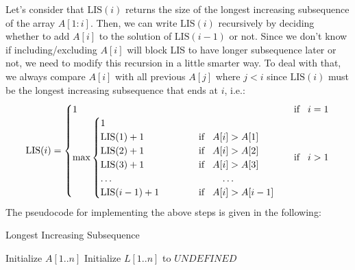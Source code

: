 \documentclass[11pt]{article}
\theoremstyle{definition}
\begin{document}
Let's consider that $\text{LIS}(i)$ returns the size of the longest increasing subsequence of the array $A[1:i]$. Then, we can write $\text{LIS}(i)$ recursively by deciding whether to add $A[i]$ to the solution of $\text{LIS}(i-1)$ or not. Since we don't know if including/excluding $A[i]$ will block LIS to have longer subsequence later or not, we need to modify this recursion in a little smarter way. To deal with that, we always compare $A[i]$ with all previous $A[j]$ where $j<i$ since $\text{LIS}(i)$ must be the longest increasing subsequence that ends at $i$, i.e.:
\begin{equation*}
\text{LIS}(i)=
\begin{cases}
1 \hspace{5cm} &\text{if} \hspace{0.3cm} i=1 \\
\text{max}
    \begin{cases}
    1 \hspace{4cm} \\
    \text{LIS}(1)+1 \hspace{2cm} \text{if} \hspace{0.3cm} A[i]>A[1]\\
    \text{LIS}(2)+1 \hspace{2cm} \text{if} \hspace{0.3cm} A[i]>A[2]\\
    \text{LIS}(3)+1 \hspace{2cm} \text{if} \hspace{0.3cm} A[i]>A[3]\\
    \ldots \hspace{4cm} \ldots\\
    \text{LIS}(i-1)+1 \hspace{1.45cm} \text{if} \hspace{0.3cm} A[i]>A[i-1]\\
    \end{cases}
    &\text{if} \hspace{0.3cm} i>1
\end{cases}
\end{equation*}
The pseudocode for implementing the above steps is given in the following:

\begin{algorithm}[H]
\caption{Longest Increasing Subsequence}\label{LIS}
\begin{algorithmic}[1]
\State Initialize $A[1..n]$
\State Initialize $L[1..n]$ to $UNDEFINED$
    \EndIf
\EndFor
\State {}
\EndFunction
\State{\null}
 
    \State {}
\EndIf
{}
    \State {}
\EndIf
{}
        \EndIf
    \EndIf
\EndFor
\State {}
\EndFunction
\end{algorithmic}
\end{algorithm}
\end{document}
